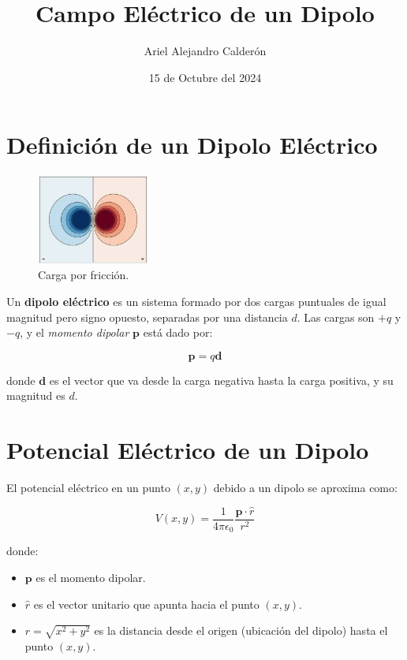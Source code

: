 \documentclass{article}
\begin{document}
\title{Campo Eléctrico de un Dipolo}
\author{Ariel Alejandro Calderón}
\date{15 de Octubre del 2024}
\maketitle

\section*{Definición de un Dipolo Eléctrico}

\begin{figure}
    \centering
    \includegraphics[width=0.33\textwidth]{./public/dipolo.png}
    \caption{Carga por fricción.}
\end{figure}

Un \textbf{dipolo eléctrico} es un sistema formado por dos cargas puntuales de igual magnitud pero signo opuesto, separadas por una distancia \( d \). Las cargas son \( +q \) y \( -q \), y el \textit{momento dipolar} \( \mathbf{p} \) está dado por:

\[
\mathbf{p} = q \mathbf{d}
\]

donde \( \mathbf{d} \) es el vector que va desde la carga negativa hasta la carga positiva, y su magnitud es \( d \).

\section*{Potencial Eléctrico de un Dipolo}

El potencial eléctrico en un punto \( (x, y) \) debido a un dipolo se aproxima como:

\[
V(x, y) = \frac{1}{4\pi\epsilon_0} \frac{\mathbf{p} \cdot \hat{r}}{r^2}
\]

donde:
\begin{itemize}
    \item \( \mathbf{p} \) es el momento dipolar.
    \item \( \hat{r} \) es el vector unitario que apunta hacia el punto \( (x, y) \).
    \item \( r = \sqrt{x^2 + y^2} \) es la distancia desde el origen (ubicación del dipolo) hasta el punto \( (x, y) \).
\end{itemize}
\end{document}
